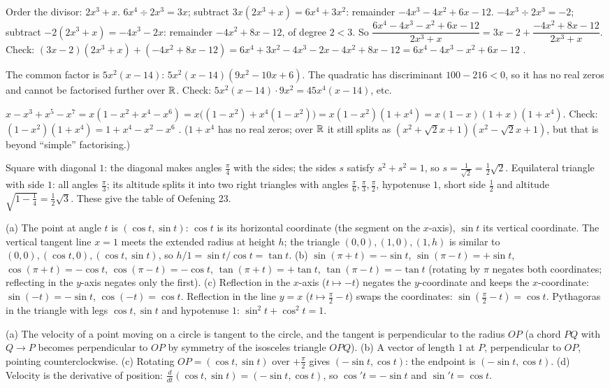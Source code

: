  Order the divisor: $2x^3+x$. $6x^4\div2x^3=3x$; subtract $3x(2x^3+x)=6x^4+3x^2$: remainder $-4x^3-4x^2+6x-12$. $-4x^3\div2x^3=-2$; subtract $-2(2x^3+x)=-4x^3-2x$: remainder $-4x^2+8x-12$, of degree $2<3$. So $\dfrac{6x^4-4x^3-x^2+6x-12}{2x^3+x}=3x-2+\dfrac{-4x^2+8x-12}{2x^3+x}$. Check: $(3x-2)(2x^3+x)+(-4x^2+8x-12)=6x^4+3x^2-4x^3-2x-4x^2+8x-12=6x^4-4x^3-x^2+6x-12$ \checkmark.

 The common factor is $5x^2(x-14)$: $5x^2(x-14)(9x^2-10x+6)$. The quadratic has discriminant $100-216<0$, so it has no real zeros and cannot be factorised further over $\mathbb{R}$. Check: $5x^2(x-14)\cdot9x^2=45x^4(x-14)$, etc.

 $x-x^3+x^5-x^7=x(1-x^2+x^4-x^6)=x\big((1-x^2)+x^4(1-x^2)\big)=x(1-x^2)(1+x^4)=x(1-x)(1+x)(1+x^4)$. Check: $(1-x^2)(1+x^4)=1+x^4-x^2-x^6$ \checkmark. ($1+x^4$ has no real zeros; over $\mathbb{R}$ it still splits as $(x^2+\sqrt2x+1)(x^2-\sqrt2x+1)$, but that is beyond ``simple'' factorising.)

 Square with diagonal $1$: the diagonal makes angles $\frac\pi4$ with the sides; the sides $s$ satisfy $s^2+s^2=1$, so $s=\frac1{\sqrt2}=\frac12\sqrt2$. Equilateral triangle with side $1$: all angles $\frac\pi3$; its altitude splits it into two right triangles with angles $\frac\pi6,\frac\pi3,\frac\pi2$, hypotenuse $1$, short side $\frac12$ and altitude $\sqrt{1-\frac14}=\frac12\sqrt3$. These give the table of Oefening 23.

 (a) The point at angle $t$ is $(\cos t,\sin t)$: $\cos t$ is its horizontal coordinate (the segment on the $x$-axis), $\sin t$ its vertical coordinate. The vertical tangent line $x=1$ meets the extended radius at height $h$; the triangle $(0,0),(1,0),(1,h)$ is similar to $(0,0),(\cos t,0),(\cos t,\sin t)$, so $h/1=\sin t/\cos t=\tan t$. (b) $\sin(\pi+t)=-\sin t$, $\sin(\pi-t)=+\sin t$, $\cos(\pi+t)=-\cos t$, $\cos(\pi-t)=-\cos t$, $\tan(\pi+t)=+\tan t$, $\tan(\pi-t)=-\tan t$ (rotating by $\pi$ negates both coordinates; reflecting in the $y$-axis negates only the first). (c) Reflection in the $x$-axis ($t\mapsto-t$) negates the $y$-coordinate and keeps the $x$-coordinate: $\sin(-t)=-\sin t$, $\cos(-t)=\cos t$. Reflection in the line $y=x$ ($t\mapsto\frac\pi2-t$) swaps the coordinates: $\sin(\frac\pi2-t)=\cos t$. Pythagoras in the triangle with legs $\cos t,\sin t$ and hypotenuse $1$: $\sin^2t+\cos^2t=1$.

 (a) The velocity of a point moving on a circle is tangent to the circle, and the tangent is perpendicular to the radius $OP$ (a chord $PQ$ with $Q\to P$ becomes perpendicular to $OP$ by symmetry of the isosceles triangle $OPQ$). (b) A vector of length $1$ at $P$, perpendicular to $OP$, pointing counterclockwise. (c) Rotating $OP=(\cos t,\sin t)$ over $+\frac\pi2$ gives $(-\sin t,\cos t)$: the endpoint is $(-\sin t,\cos t)$. (d) Velocity is the derivative of position: $\frac d{dt}(\cos t,\sin t)=(-\sin t,\cos t)$, so $\cos't=-\sin t$ and $\sin't=\cos t$.

